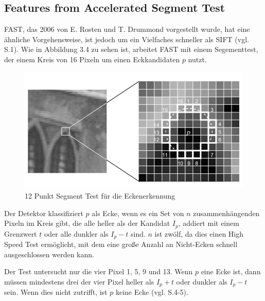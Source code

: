 \subsection{Features from Accelerated Segment Test}
FAST, das 2006 von E. Rosten und T. Drummond vorgestellt wurde, hat eine ähnliche Vorgehensweise, ist jedoch um ein Vielfaches schneller als SIFT (vgl. \cite{fast} S.1). Wie in Abbildung 3.4 zu sehen ist, arbeitet FAST mit einem Segementtest, der einem Kreis von 16 Pixeln um einen Eckkandidaten $p$ nutzt. 

\begin{figure}[H]
	\centering
	\includegraphics[scale=0.75]{fast.png}
	\caption{12 Punkt Segment Test für die Eckenerkennung \cite{fast}}
\end{figure}

Der Detektor klassifiziert $p$ als Ecke, wenn es ein Set von $n$ zusammenhängenden Pixeln im Kreis gibt, die alle heller als der Kandidat $I_p$, addiert mit einem Grenzwert $t$ oder alle dunkler als $I_p - t$ sind. $n$ ist zwölf, da dies einen High Speed Test ermöglicht, mit dem eine große Anzahl an Nicht-Ecken schnell ausgeschlossen werden kann. 

Der Test untersucht nur die vier Pixel 1, 5, 9 und 13. Wenn $p$ eine Ecke ist, dann müssen mindestens drei der vier Pixel heller als $I_p + t$ oder dunkler als $I_p - t$  sein. Wenn dies nicht zutrifft, ist $p$ keine Ecke (vgl. \cite{fast} S.4-5).

